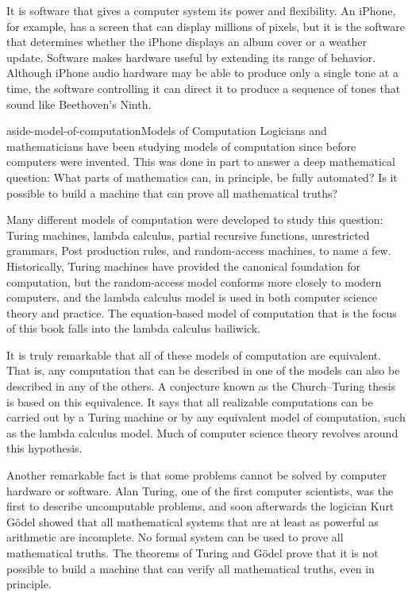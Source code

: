 It is software that gives a computer system its power and flexibility.
An iPhone, for example, has a screen that
can display millions of pixels,
but it is the software that determines whether the
iPhone displays an album cover or a weather update.
Software makes hardware useful by extending its range of behavior.
Although iPhone audio hardware may be able to produce
only a single tone at a time, the software controlling it
can direct it to produce a sequence of tones
that sound like Beethoven's Ninth.

\begin{aside}{aside-model-of-computation}{Models of Computation}
Logicians and mathematicians have been studying
models of computation
since before computers were invented. This was done in part to
answer a deep mathematical question: What parts of mathematics can,
in principle, be fully automated?  Is it possible to
build a machine that can prove all mathematical truths?

Many different models of computation were developed to study this question:
Turing machines, lambda calculus,
partial recursive functions,
unrestricted grammars, Post production rules, and random-access machines,
to name a few.
Historically, Turing machines have provided the canonical foundation for computation,
but the random-access model conforms more closely to modern computers,
and the lambda calculus model is used in both computer science theory and practice.
The equation-based model of computation that is the focus of this book
falls into the lambda calculus bailiwick.

It is truly remarkable that all of these models of
computation are equivalent.  That is,
any computation that can be described in one of the models can
also be described in any of the others.
A conjecture known as the Church--Turing thesis
is based on this equivalence.
It says that all realizable computations can
be carried out by a Turing machine or by
any equivalent model of computation, such as
the lambda calculus model.
Much of computer science theory
revolves around this hypothesis.

Another remarkable fact is that some problems cannot be solved
by computer hardware or software.
Alan Turing, one of the first computer scientists,
was the first to describe
uncomputable problems,
and soon afterwards the logician Kurt G\"odel
showed that all mathematical systems that are at least as
powerful as arithmetic
are incomplete. No formal system can be used
to prove all mathematical truths.
The theorems of Turing and G\"odel
prove that it is not possible to build a machine that can verify all mathematical
truths, even in principle.
\end{aside}

